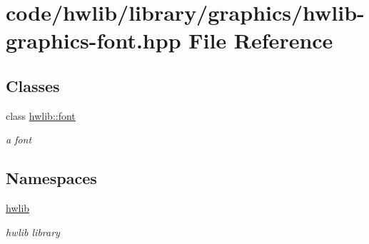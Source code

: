 \hypertarget{hwlib-graphics-font_8hpp}{}\section{code/hwlib/library/graphics/hwlib-\/graphics-\/font.hpp File Reference}
\label{hwlib-graphics-font_8hpp}
\subsection*{Classes}
\begin{DoxyCompactItemize}
\item 
class \hyperlink{classhwlib_1_1font}{hwlib\+::font}
\begin{DoxyCompactList}\small\item\em a font \end{DoxyCompactList}\end{DoxyCompactItemize}
\subsection*{Namespaces}
\begin{DoxyCompactItemize}
\item 
 \hyperlink{namespacehwlib}{hwlib}
\begin{DoxyCompactList}\small\item\em hwlib library \end{DoxyCompactList}\end{DoxyCompactItemize}
